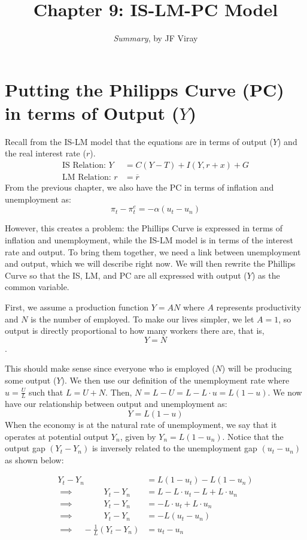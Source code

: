\documentclass{extarticle}
\title{\vspace{-2em}Chapter 9: IS-LM-PC Model}
\author{\emph{Summary}, by JF Viray}
\date{}
\begin{document}
\maketitle

\section{Putting the Philipps Curve (PC) in terms of Output ($Y$)}
Recall from the IS-LM model that the equations are in terms of output ($Y$) and the real interest rate ($r$). 
\begin{align*}
  \text{IS Relation: } Y &= C(Y-T) + I(Y, r + x) + G \\
  \text{LM Relation: } r &= \overline{r}
\end{align*}
From the previous chapter, we also have the PC in terms of inflation and unemployment as:
$$\pi_t - \pi^e_t = -\alpha (u_t- u_n)$$

However, this creates a problem: the Phillips Curve is expressed in terms of inflation and unemployment, while the IS-LM model is in terms of the interest rate and output. 
To bring them together, we need a link between unemployment and output, which we will describe right now. 
We will then rewrite the Phillips Curve so that the IS, LM, and PC are all expressed with output ($Y$) as the common variable.

First, we assume a production function $Y = AN$ where $A$ represents productivity and $N$ is the number of employed. To make our lives simpler, we let $A = 1$, so output is directly proportional to how many workers there are, that is, $$Y = N$$.

This should make sense since everyone who is employed ($N$) will be producing some output ($Y$).
We then use our definition of the unemployment rate where $u = \frac{U}{L}$ such that $L = U + N$. Then, $N = L - U = L - L \cdot u =  L(1 - u)$. We now have our relationship between output and unemployment as:
$$Y = L(1-u)$$
When the economy is at the natural rate of unemployment, we say that it operates at potential output \(Y_n\), given by $ Y_n = L(1 - u_n).$ 
Notice that the output gap $(Y_t - Y_n)$ is inversely related to the unemployment gap \((u_t - u_n)\) as shown below:

\begin{align*}
    Y_t - Y_n &= L(1-u_t) - L(1-u_n) \\
    \implies \quad \quad \quad \; \: Y_t - Y_n &= L - L \cdot u_t - L + L \cdot u_n \\
    \implies \quad \quad \quad \; \: Y_t - Y_n &= - L \cdot u_t + L \cdot u_n \\
    \implies \quad \quad \quad \; \: Y_t - Y_n &= -L (u_t - u_n) \\
    \implies \quad -\frac{1}{L}(Y_t - Y_n) &= u_t - u_n
\end{align*}
\end{document}
